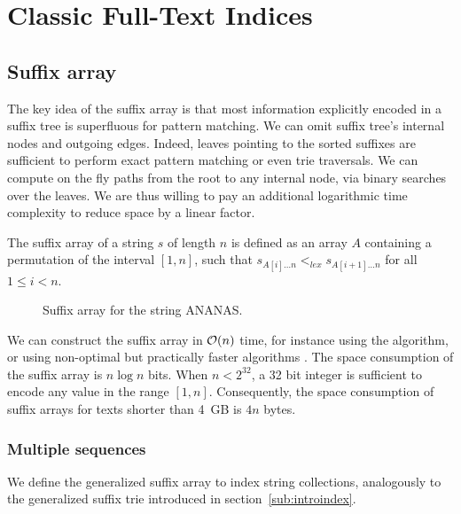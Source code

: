 \section{Classic Full-Text Indices}

\subsection{Suffix array}

The key idea of the suffix array \citep{Manber1990} is that most information explicitly encoded in a suffix tree is superfluous for pattern matching.
We can omit suffix tree's internal nodes and outgoing edges.
Indeed, leaves pointing to the sorted suffixes are sufficient to perform exact pattern matching or even trie traversals.
We can compute on the fly paths from the root to any internal node, via binary searches over the leaves.
We are thus willing to pay an additional logarithmic time complexity to reduce space by a linear factor.

\begin{definition}
The suffix array of a string $s$ of length $n$ is defined as an array $A$ containing a permutation of the interval $[1,n]$, such that $s_{A[i] \dots n} <_{lex} s_{A[i+1] \dots n}$ for all $1 \leq i < n$.
\end{definition}

\begin{figure}[h]
\caption{Suffix array for the string ANANAS.}
\label{fig:sa}
\begin{center}
\end{center}
\end{figure}

We can construct the suffix array in $\mathcal{O}(n)$ time, for instance using the \citep{Karkkainen2003} algorithm, or using non-optimal but practically faster algorithms \citep{?}.
The space consumption of the suffix array is $n \log{n}$ bits.
When $n < 2^{32}$, a 32 bit integer is sufficient to encode any value in the range $[1,n]$.
Consequently, the space consumption of suffix arrays for texts shorter than 4~GB is $4 n$ bytes.

\subsubsection{Multiple sequences}

We define the generalized suffix array to index string collections, analogously to the generalized suffix trie introduced in section~\ref{sub:introindex}.

